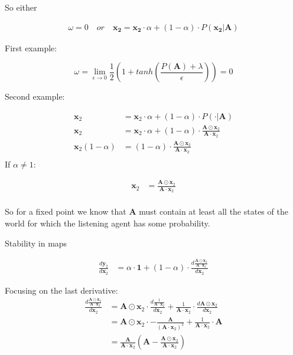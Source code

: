 So either

\begin{align*}
    \omega = 0 \quad or \quad \mathbf{x_2} = \mathbf{x_2} \cdot \alpha + (1 - \alpha) \cdot P( \mathbf{x_2} | \mathbf{A})
\end{align*}

First example:

\begin{equation*}
    \omega =  \lim_{\epsilon \to 0}  \frac{1}{2} \left( 1 + tanh \left( \frac{P(\mathbf{A}) + \lambda}{\epsilon}  \right) \right) = 0
\end{equation*}

Second example:

\begin{align*}
    \mathbf{x}_2 &= \mathbf{x}_2 \cdot \alpha + (1 - \alpha) \cdot P(\cdot | \mathbf{A}) \\
    \mathbf{x}_2 &= \mathbf{x}_2 \cdot \alpha + (1 - \alpha) \cdot \frac{\mathbf{A} \odot \mathbf{x}_2}{\mathbf{A} \cdot \mathbf{x}_2}\\
    \mathbf{x}_2 (1 - \alpha ) &= (1 - \alpha) \cdot \frac{\mathbf{A} \odot \mathbf{x}_2}{\mathbf{A} \cdot \mathbf{x}_2}\\
\end{align*}
If $\alpha \neq 1$:

\begin{align*}
    \mathbf{x}_2 &= \frac{\mathbf{A} \odot \mathbf{x}_2}{\mathbf{A} \cdot \mathbf{x}_2}\\
\end{align*}

So for a fixed point we know that $\mathbf{A}$ must contain at least all the states of the world for which the listening agent has some probability. 


Stability in maps

\begin{align*}
    \frac{d \mathbf{y}_2}{d \mathbf{x}_2} &= \alpha \cdot \mathbf{1} + (1 - \alpha) \cdot \frac{d \frac{\mathbf{A} \odot \mathbf{x}_2}{\mathbf{A} \cdot \mathbf{x}_2}}{d \mathbf{x}_2}
\end{align*}

Focusing on the last derivative:
\begin{align*}
    \frac{d \frac{\mathbf{A} \odot \mathbf{x}_2}{\mathbf{A} \cdot \mathbf{x}_2}}{d \mathbf{x}_2} &= \mathbf{A} \odot \mathbf{x}_2 \cdot \frac{d \frac{1}{\mathbf{A} \cdot \mathbf{x}_2}}{d \mathbf{x}_2} + \frac{1}{\mathbf{A} \cdot \mathbf{x}_2} \cdot \frac{d \mathbf{A} \odot \mathbf{x}_2}{d \mathbf{x}_2}  \\
    &= \mathbf{A} \odot \mathbf{x}_2 \cdot - \frac{\mathbf{A}}{(\mathbf{A} \cdot \mathbf{x}_2)^2} + \frac{1}{\mathbf{A} \cdot \mathbf{x}_2} \cdot \mathbf{A} \\
    &= \frac{\mathbf{A}}{\mathbf{A} \cdot \mathbf{x}_2} \left(  \mathbf{A} - \frac{\mathbf{A} \odot \mathbf{x}_2}{\mathbf{A} \cdot \mathbf{x}_2}  \right)
\end{align*}


